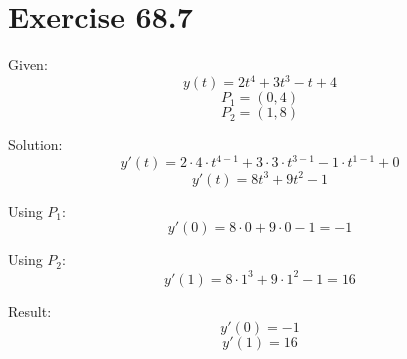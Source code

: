 \documentclass[a4paper, 10pt]{scrartcl}
\begin{document}
\section{Exercise 68.7}

Given:
\[y(t) = 2t^{4} + 3t^{3} - t + 4\]
\[P_{1} = (0, 4)\]
\[P_{2} = (1, 8)\]

Solution:
\[y'(t) = 2\cdot4\cdot t^{4 - 1} + 3\cdot3\cdot t^{3 - 1} - 1\cdot t^{1 - 1} + 0\]
\[y'(t) = 8t^{3} + 9t^{2} - 1\]

Using $P_{1}$:
\[y'(0) = 8\cdot0 + 9\cdot0 - 1 = -1\]

Using $P_{2}$:
\[y'(1) = 8\cdot1^{3} + 9\cdot1^{2} - 1 = 16\]

Result:
\[y'(0) = -1\]
\[y'(1) = 16\]
\end{document}
